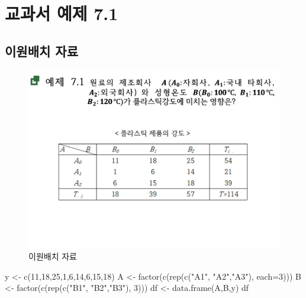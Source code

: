 \documentclass[
]{book}
\newenvironment{Shaded}{\begin{snugshade}}{\end{snugshade}}
\newcommand{\AttributeTok}[1]{\textcolor[rgb]{0.77,0.63,0.00}{#1}}
\newcommand{\DecValTok}[1]{\textcolor[rgb]{0.00,0.00,0.81}{#1}}
\newcommand{\FunctionTok}[1]{\textcolor[rgb]{0.00,0.00,0.00}{#1}}
\newcommand{\NormalTok}[1]{#1}
\newcommand{\OtherTok}[1]{\textcolor[rgb]{0.56,0.35,0.01}{#1}}
\newcommand{\StringTok}[1]{\textcolor[rgb]{0.31,0.60,0.02}{#1}}
\begin{document}
\hypertarget{ex71}{%
\chapter{교과서 예제 7.1}\label{ex71}}

\hypertarget{uxc774uxc6d0uxbc30uxce58-uxc790uxb8cc}{%
\section{이원배치 자료}\label{uxc774uxc6d0uxbc30uxce58-uxc790uxb8cc}}

\begin{figure}
\centering
\includegraphics{slide01.png}
\caption{이원배치 자료}
\end{figure}

\begin{Shaded}
\begin{Highlighting}[]
\NormalTok{y }\OtherTok{\textless{}{-}} \FunctionTok{c}\NormalTok{(}\DecValTok{11}\NormalTok{,}\DecValTok{18}\NormalTok{,}\DecValTok{25}\NormalTok{,}\DecValTok{1}\NormalTok{,}\DecValTok{6}\NormalTok{,}\DecValTok{14}\NormalTok{,}\DecValTok{6}\NormalTok{,}\DecValTok{15}\NormalTok{,}\DecValTok{18}\NormalTok{)}
\NormalTok{A }\OtherTok{\textless{}{-}} \FunctionTok{factor}\NormalTok{(}\FunctionTok{c}\NormalTok{(}\FunctionTok{rep}\NormalTok{(}\FunctionTok{c}\NormalTok{(}\StringTok{"A1"}\NormalTok{, }\StringTok{"A2"}\NormalTok{,}\StringTok{"A3"}\NormalTok{), }\AttributeTok{each=}\DecValTok{3}\NormalTok{)))}
\NormalTok{B }\OtherTok{\textless{}{-}} \FunctionTok{factor}\NormalTok{(}\FunctionTok{c}\NormalTok{(}\FunctionTok{rep}\NormalTok{(}\FunctionTok{c}\NormalTok{(}\StringTok{"B1"}\NormalTok{, }\StringTok{"B2"}\NormalTok{,}\StringTok{"B3"}\NormalTok{), }\DecValTok{3}\NormalTok{)))}
\NormalTok{df }\OtherTok{\textless{}{-}} \FunctionTok{data.frame}\NormalTok{(A,B,y)}
\NormalTok{df}
\end{Highlighting}
\end{Shaded}
\end{document}

